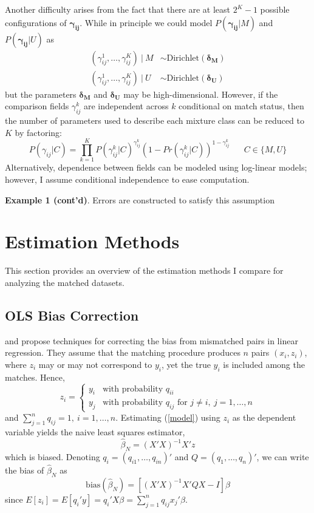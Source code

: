 \documentclass[12pt]{article}
\newcommand\gamij{\mathbf{\gamma_{ij}}}
\begin{document}
\begin{enumerate}
Another difficulty arises from the fact that there are at least $2^K -1$ possible configurations of $\gamij$.  While in principle we could model $P(\gamij | M)$ and $P(\gamij | U)$ as
\begin{align*} (\gamma_{ij}^1, \dots, \gamma_{ij}^K) \  |\  M &\sim \text{Dirichlet}(\mathbf{\delta_M})\\
 (\gamma_{ij}^1, \dots, \gamma_{ij}^K) \  |\  U &\sim \text{Dirichlet}(\mathbf{\delta_U}) \end{align*}
but the parameters $\mathbf{\delta_M}$ and $\mathbf{\delta_U}$ may be high-dimensional.  However, if the comparison fields $\gamma_{ij}^{k}$ are independent across $k$ conditional on match status, then the number of parameters used to describe each mixture class can be reduced to $K$ by factoring:
 \begin{equation} 
 P(\gamma_{ij} | C) = \prod_{k=1}^K P(\gamma_{ij}^{k} | C)^{\gamma_{ij}^{k}}(1-Pr(\gamma_{ij}^{k} | C))^{1-\gamma_{ij}^{k}} \hspace{20pt} C\in \{M, U\} 
 \label{eq:condInd}
 \end{equation}
 Alternatively, dependence between fields can be modeled using log-linear models; however, I assume conditional independence to ease computation.  

\textbf{Example 1 (cont'd)}.  Errors are constructed to satisfy this assumption

\section{Estimation Methods}
This section provides an overview of the estimation methods I compare for analyzing the matched datasets. 
\subsection{OLS Bias Correction}
 \cite{sw1993} and \cite{lahiri05} propose techniques for correcting the bias from mismatched pairs in linear regression.  They assume that the matching procedure produces $n$ pairs $(x_i, z_i)$, where $z_i$ may or may not correspond to $y_i$, yet the true $y_i$ is included among the matches.   Hence, 
$$z_i = \begin{cases} y_i & \text{with probability $q_{ii}$} \\ y_j & \text{with probability $q_{ij}$ for $j\neq i,\ j = 1,\dots,n $} \end{cases}$$ 
and $\sum_{j=1}^n q_{ij} = 1, \ i=1,\dots, n$.  Estimating (\ref{model}) using $z_i$ as the dependent variable yields the naive least squares estimator, 
\begin{equation} \hat{\beta}_N = (X'X)^{-1} X'z \label{naive} \end{equation}
which is biased.   Denoting $q_i = (q_{i1}, \dots, q_{in})'$ and $Q = (q_1, \dots, q_n)'$, we can write the bias of $\hat{\beta}_N $ as
$$\text{bias}(\hat{\beta}_N) = [(X'X)^{-1} X'QX - I] \beta $$ 
 since $E[z_i] = E[q_i'y]  = q_i'X\beta =  \sum_{j=1}^{n} q_{ij} x_j'\beta $.  


\end{enumerate}
\end{document}
